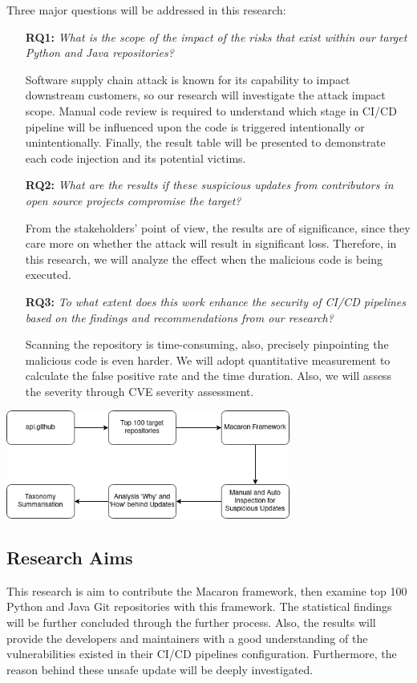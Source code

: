 Three major questions will be addressed in this research:
\begin{enumerate}
    \item[{\textbf{RQ1:}}] \emph{What is the scope of the impact of the risks that exist within our target Python and Java repositories?}
    
    Software supply chain attack is known for its capability to impact downstream customers, so our research will investigate
    the attack impact scope. Manual code review is required to understand which stage in CI/CD pipeline will be influenced 
    upon the code is triggered intentionally or unintentionally. Finally, the result table will be presented to demonstrate each 
    code injection and its potential victims.  
    \item[{\textbf{RQ2:}}] \emph{What are the results if these suspicious updates from contributors in open source projects compromise the target?}
    
    From the stakeholders' point of view, the results are of significance, since they care more on whether the attack 
    will result in significant loss. Therefore, in this research, we will analyze the effect when the malicious code is being executed.

    \item[{\textbf{RQ3:}}] \emph{To what extent does this work enhance the security of CI/CD pipelines based on the findings and recommendations from our research?}

    Scanning the repository is time-consuming, also, precisely pinpointing the malicious code is even harder. We will adopt 
    quantitative measurement to calculate the false positive rate and the time duration. Also, we will assess the severity 
    through CVE severity assessment.
\end{enumerate}

\begin{center}
    \includegraphics[width=0.7\textwidth]{./screenshot/research_method.png}
\end{center}

\subsection{Research Aims}
This research is aim to contribute the Macaron framework, then examine top 100 Python and Java Git 
repositories with this framework. The statistical findings will be further concluded through the further process.
Also, the results will provide the developers and maintainers with a good understanding 
of the vulnerabilities existed in their CI/CD pipelines configuration. Furthermore, the reason behind
these unsafe update will be deeply investigated.


